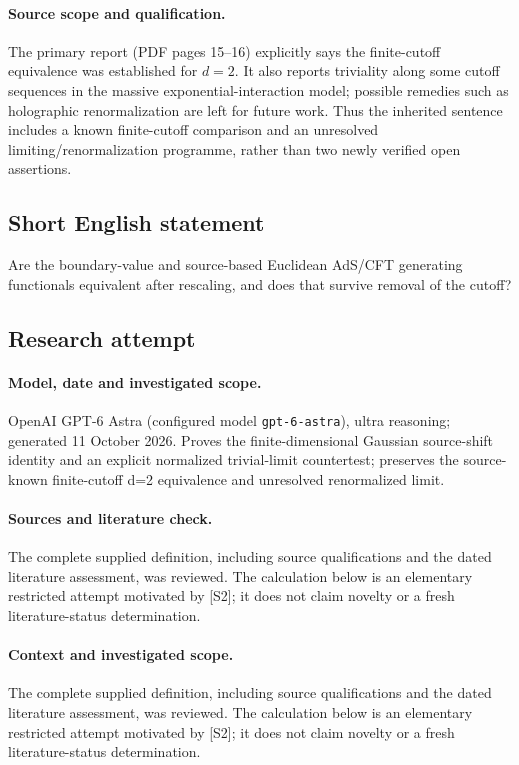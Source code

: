 \documentclass[11pt]{article}
\begin{document}
\paragraph{Source scope and qualification.}
The primary report (PDF pages 15--16) explicitly says the finite-cutoff equivalence was established for $d=2$. It also reports triviality along some cutoff sequences in the massive exponential-interaction model; possible remedies such as holographic renormalization are left for future work. Thus the inherited sentence includes a known finite-cutoff comparison and an unresolved limiting/renormalization programme, rather than two newly verified open assertions.
\subsection{Short English statement}
Are the boundary-value and source-based Euclidean AdS/CFT generating functionals equivalent after rescaling, and does that survive removal of the cutoff?
\subsection{Research attempt}
\paragraph{Model, date and investigated scope.}
OpenAI GPT-6 Astra (configured model \texttt{gpt-6-astra}), ultra reasoning; generated 11 October 2026. Proves the finite-dimensional Gaussian source-shift identity and an explicit normalized trivial-limit countertest; preserves the source-known finite-cutoff d=2 equivalence and unresolved renormalized limit.

\paragraph{Sources and literature check.}
The complete supplied definition, including source qualifications and the dated literature assessment, was reviewed. The calculation below is an elementary restricted attempt motivated by [S2]; it does not claim novelty or a fresh literature-status determination.

\paragraph{Context and investigated scope.} The complete supplied definition, including source qualifications and the dated literature assessment, was reviewed. The calculation below is an elementary restricted attempt motivated by [S2]; it does not claim novelty or a fresh literature-status determination.
\end{document}
